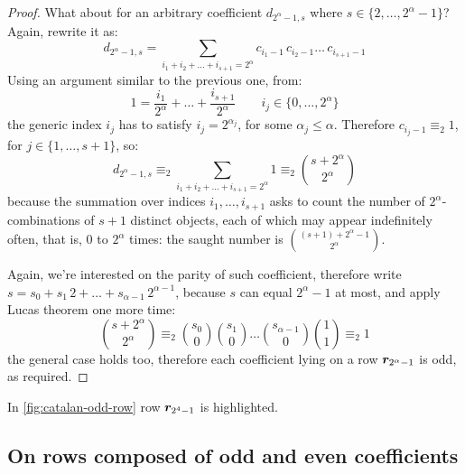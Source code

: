 \begin{proof}
    What about for an arbitrary coefficient $d_{2^{\alpha}-1,s}$ where
    $s\in\lbrace{2,\ldots,2^{\alpha}-1}\rbrace$?  Again, rewrite it as:
    \begin{displaymath}
        d_{2^{\alpha}-1,s} = \sum_{i_{1}+i_{2}+\ldots+i_{s+1}=2^{\alpha}}
            {c_{i_{1}-1}\,c_{i_{2}-1}\ldots\,c_{i_{s+1}-1}}
    \end{displaymath}
    Using an argument similar to the previous one, from:
    \begin{displaymath}
        1 = \frac{i_{1}}{2^{\alpha}}+\ldots+\frac{i_{s+1}}{2^{\alpha}} \qquad 
            i_{j}\in\lbrace 0,\ldots,2^{\alpha}\rbrace
    \end{displaymath} 
    the generic index $i_{j}$ has to satisfy $i_{j}=2^{\alpha_{j}}$, for some
    $\alpha_{j}\leq\alpha$. Therefore $c_{i_{j}-1}\equiv_{2}1$,
    for $j\in\lbrace1,\ldots,s+1\rbrace$, so:
    \begin{displaymath}
        d_{2^{\alpha}-1,s} \equiv_{2} \sum_{i_{1}+i_{2}+\ldots+i_{s+1}=2^{\alpha}}{1}
            \equiv_{2} {{s+2^{\alpha}}\choose{2^{\alpha}}}
    \end{displaymath}
    because the summation over indices $i_{1},\ldots,i_{s+1}$ asks to count the
    number of $2^{\alpha}$-combinations of $s+1$ distinct objects, each of
    which may appear indefinitely often, that is, $0$ to $2^{\alpha}$ times:
    the saught number is ${{(s+1)+2^{\alpha}-1}\choose{2^{\alpha}}}$.

    Again, we're interested on the parity of such coefficient, therefore
    write $s=s_{0}+s_{1}\,2+\ldots+s_{\alpha-1}\,2^{\alpha-1}$, because $s$ can equal 
    $2^{\alpha}-1$ at most, and apply Lucas theorem one more time:
    \begin{displaymath}
        {{s+2^{\alpha}}\choose{2^{\alpha}}}\equiv_{2} 
            {{s_{0}}\choose{0}}{{s_{1}}\choose{0}} \ldots
                {{s_{\alpha-1}}\choose{0}}{{1}\choose{1}}\equiv_{2}1 
    \end{displaymath}
    the general case holds too, therefore each coefficient lying on
    a row $\boldsymbol{r}_{2^{\alpha}-1}$ is odd, as required.
\end{proof}


In \autoref{fig:catalan-odd-row} row $\boldsymbol{r}_{2^{4}-1}$ is highlighted.

\subsection{On rows composed of odd and even coefficients}

